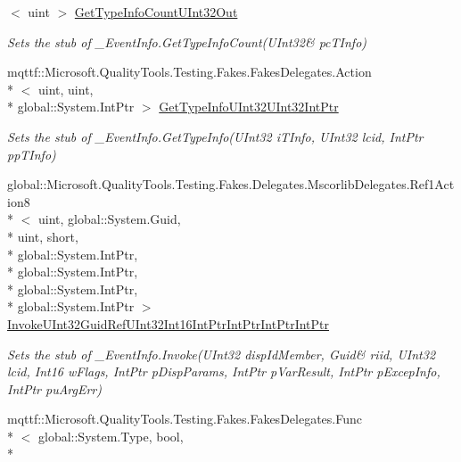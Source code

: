 \begin{DoxyCompactItemize}
$<$ uint $>$ \hyperlink{class_system_1_1_runtime_1_1_interop_services_1_1_fakes_1_1_stub___event_info_a7aeca9f21c90e5a696a56faf7c75d651}{Get\-Type\-Info\-Count\-U\-Int32\-Out}
\begin{DoxyCompactList}\small\item\em Sets the stub of \-\_\-\-Event\-Info.\-Get\-Type\-Info\-Count(U\-Int32\& pc\-T\-Info)\end{DoxyCompactList}\item 
mqttf\-::\-Microsoft.\-Quality\-Tools.\-Testing.\-Fakes.\-Fakes\-Delegates.\-Action\\*
$<$ uint, uint, \\*
global\-::\-System.\-Int\-Ptr $>$ \hyperlink{class_system_1_1_runtime_1_1_interop_services_1_1_fakes_1_1_stub___event_info_a09481f37137f86a1ced5fbfa50d92f89}{Get\-Type\-Info\-U\-Int32\-U\-Int32\-Int\-Ptr}
\begin{DoxyCompactList}\small\item\em Sets the stub of \-\_\-\-Event\-Info.\-Get\-Type\-Info(\-U\-Int32 i\-T\-Info, U\-Int32 lcid, Int\-Ptr pp\-T\-Info)\end{DoxyCompactList}\item 
global\-::\-Microsoft.\-Quality\-Tools.\-Testing.\-Fakes.\-Delegates.\-Mscorlib\-Delegates.\-Ref1\-Action8\\*
$<$ uint, global\-::\-System.\-Guid, \\*
uint, short, \\*
global\-::\-System.\-Int\-Ptr, \\*
global\-::\-System.\-Int\-Ptr, \\*
global\-::\-System.\-Int\-Ptr, \\*
global\-::\-System.\-Int\-Ptr $>$ \hyperlink{class_system_1_1_runtime_1_1_interop_services_1_1_fakes_1_1_stub___event_info_af769e4a3884039ea7754e3f9d268e54d}{Invoke\-U\-Int32\-Guid\-Ref\-U\-Int32\-Int16\-Int\-Ptr\-Int\-Ptr\-Int\-Ptr\-Int\-Ptr}
\begin{DoxyCompactList}\small\item\em Sets the stub of \-\_\-\-Event\-Info.\-Invoke(U\-Int32 disp\-Id\-Member, Guid\& riid, U\-Int32 lcid, Int16 w\-Flags, Int\-Ptr p\-Disp\-Params, Int\-Ptr p\-Var\-Result, Int\-Ptr p\-Excep\-Info, Int\-Ptr pu\-Arg\-Err)\end{DoxyCompactList}\item 
mqttf\-::\-Microsoft.\-Quality\-Tools.\-Testing.\-Fakes.\-Fakes\-Delegates.\-Func\\*
$<$ global\-::\-System.\-Type, bool, \\*

\end{DoxyCompactItemize}
